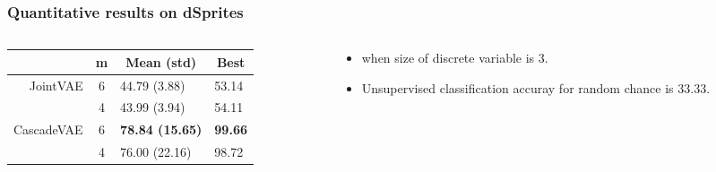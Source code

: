 \documentclass[10pt,mathserif]{beamer}
\begin{document}
\begin{frame}
\frametitle{Quantitative results on dSprites}
\begin{columns}
\begin{column}{0.5\textwidth}
\begin{table}[htbp]
\fontsize{9pt}{9.5pt}\selectfont
\centering
\begin{tabular}{rc ll}
\addlinespace[-\aboverulesep]
\toprule
\multicolumn{1}{c}{Method}&m&\multicolumn{1}{c}{Mean (std)}&\multicolumn{1}{c}{Best}\\
\toprule
JointVAE & 6&44.79 (3.88) &53.14\\
        &  4&43.99 (3.94) &54.11\\
\midrule
CascadeVAE &6&\textbf{78.84 (15.65)}& \textbf{99.66}\\
                &4&76.00 (22.16)& 98.72\\
\bottomrule
\end{tabular}
\end{table}
\end{column}
\begin{column}{0.4\textwidth}
\begin{itemize}\itemsep=12pt
\item {\color{blue}{Unsupervised classification accuracy}} when size of discrete variable is 3.
\item Unsupervised classification accuray for random chance is $33.33$.
\end{itemize}

\end{column}
\end{columns}
\end{frame}



\end{document}
